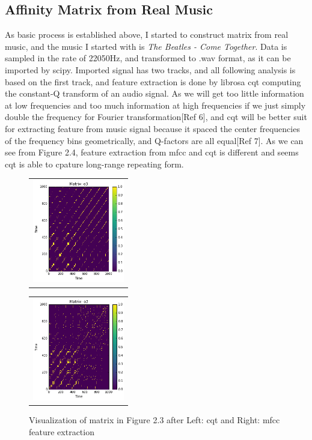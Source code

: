 \documentclass[final]{siamltexmm}
\begin{document}
\subsection{Affinity Matrix from Real Music}
As basic process is established above, I started to construct matrix from real music, and the music I started with is \textit{The Beatles - Come Together}. Data is sampled in the rate of 22050Hz, and transformed to .wav format, as it can be imported by scipy. Imported signal has two tracks, and all following analysis is based on the first track, and feature extraction is done by librosa cqt computing the constant-Q transform of an audio signal. As we will get too little information at low frequencies and too much information at high frequencies if we just simply double the frequency for Fourier transformation[Ref 6], and cqt will be better suit for extracting feature from music signal because it spaced the center frequencies of the frequency bins geometrically, and Q-factors are all equal[Ref 7]. As we can see from Figure 2.4, feature extraction from mfcc and cqt is different and seems cqt is able to cpature long-range repeating form.

\begin{figure}[H]
\centering
\begin{subfigure}
  \begin{tabular}{c}
  \includegraphics[width=40mm]{./figure/cqt.png}
  \end{tabular}{}
\end{subfigure}
  \begin{tabular}{c}
  \includegraphics[width=40mm]{./figure/mfcc.png}
  \end{tabular}{}
\begin{subfigure}
\end{subfigure}
\caption{Visualization of matrix in Figure 2.3 after Left: cqt and Right: mfcc feature extraction}
\end{figure}
\end{document}
